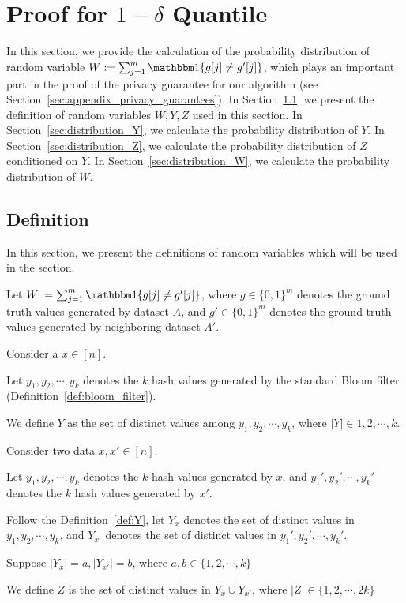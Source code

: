
\section{Proof for 
\texorpdfstring{$1 - \delta$}{} Quantile}\label{sec:appendix_quantile_proof}
In this section, we provide the calculation of the probability distribution of random variable $W := \sum_{j=1}^{m} \mathbbm 1\{g[j] \neq g'[j]\}$, which plays an important part in the proof of the privacy guarantee for our algorithm (see Section~\ref{sec:appendix_privacy_guarantees}).
In Section~\ref{sec:definition_quantile}, we present the definition of random variables $W, Y, Z$ used in this section.
In Section~\ref{sec:distribution_Y}, we calculate the probability distribution of $Y$.
In Section~\ref{sec:distribution_Z}, we calculate the probability distribution of $Z$ conditioned on $Y$.
In Section~\ref{sec:distribution_W}, we calculate the probability distribution of $W$.

\subsection{Definition} \label{sec:definition_quantile}
In this section, we present the definitions of random variables which will be used in the section.
\begin{definition}[Definition of $W$]\label{def:W}
Let $W := \sum_{j=1}^{m} \mathbbm 1\{g[j] \neq g'[j]\}$, where $g \in \{0, 1\}^m$ denotes the ground truth values generated by dataset $A$, and $g' \in \{0, 1\}^m$ denotes the ground truth values generated by neighboring dataset $A'$. 
\end{definition}

\begin{definition}[Definition of $Y$]\label{def:Y}
Consider a $x \in [n]$. 

Let $y_1, y_2, \cdots , y_k$ denotes the $k$ hash values generated by the standard Bloom filter (Definition~\ref{def:bloom_filter}). 

We define $Y$ as the set of distinct values among $y_1, y_2, \cdots, y_k$, where $|Y| \in { 1, 2, \cdots, k }$.

\end{definition}

\begin{definition}[Definition of $Z$]\label{def:Z}
Consider two data $x, x' \in [n]$. 

Let $y_1, y_2, \cdots , y_k$ denotes the $k$ hash values generated by $x$, and $y_1', y_2', \cdots , y_k'$ denotes the $k$ hash values generated by $x'$. 

Follow the Definition~\ref{def:Y}, let $Y_x$ denotes the set of distinct values in $y_1, y_2, \cdots , y_k$, and $Y_{x'}$ denotes the set of distinct values in $y_1', y_2', \cdots , y_k'$.

Suppose $|Y_x| = a, |Y_{x'}| = b$, where $a, b \in \{1, 2, \cdots , k \}$

We define $Z$ is the set of distinct values in $Y_x \cup Y_{x'}$, where $|Z| \in \{1, 2, \cdots , 2k \}$

\end{definition}


